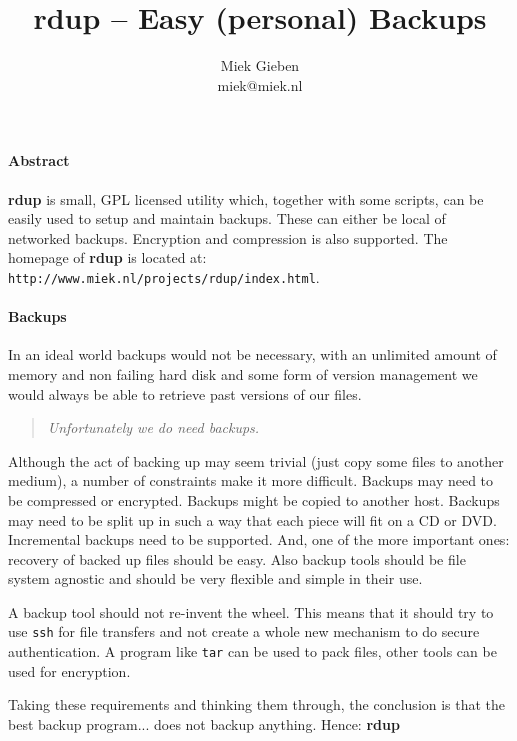\documentclass[a4, 10pt]{article}
\newcommand{\rdup}{\textbf{rdup}}
\newcommand{\cmd}[1]{\texttt{#1}}
\newcommand{\url}[1]{\texttt{#1}}
\begin{document}
\pagestyle{empty}

\title{\rdup{} -- Easy (personal) Backups}
\author{Miek Gieben\\miek@miek.nl}
\date{}
\maketitle
\thispagestyle{empty}

\paragraph{Abstract}
\rdup{} is small, GPL licensed utility which, together with some scripts, can
be easily used to setup and maintain backups. These can either be local
of networked backups. Encryption and compression is also supported.
The homepage of \rdup{} is located at: \\
\url{http://www.miek.nl/projects/rdup/index.html}.

\paragraph{Backups}
In an ideal world backups would not be necessary, with an unlimited
amount of memory and non failing hard disk and some form of version
management we would always be able to retrieve past versions of our files.
\begin{quote}
\emph{Unfortunately we do need backups.}
\end{quote}
Although the act of backing up may seem trivial (just copy some files
to another medium), a number of constraints make it more difficult. 
Backups may need to be compressed or encrypted. Backups might be copied
to another host. Backups may need to be split up in such a way that
each piece will fit on a CD or DVD. Incremental backups need to be
supported. And, one of the more important ones: recovery of backed up
files should be easy.  Also backup tools should be file system agnostic
and should be very flexible and simple in their use.

A backup tool should not re-invent the wheel.  This means that it should
try to use \cmd{ssh} for file transfers and not create a whole new
mechanism to do secure authentication. A program like \cmd{tar} can be
used to pack files, other tools can be used for encryption. 

Taking these requirements and thinking them through, the
conclusion is that the best backup program... does not backup anything.
Hence: \rdup
\end{document}

